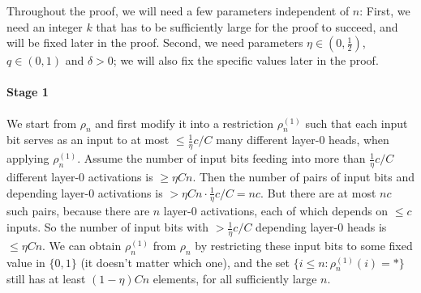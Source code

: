 \documentclass[11pt,a4paper]{article}
\begin{document}
Throughout the proof, we will need a few parameters independent of $n$: First, we need an integer $k$ that has to be sufficiently large for the proof to succeed, and will be fixed later in the proof.
Second, we need parameters $\eta \in (0, \frac{1}{2})$, $q \in (0,1)$ and $\delta > 0$; we will also fix the specific values later in the proof.



\paragraph{Stage 1}
We start from $\rho_n$ and first modify it into a restriction $\rho^{(1)}_n$ such that each input bit serves as an input to at most $\leq \frac{1}{\eta} c/C$ many different layer-0 heads, when applying $\rho^{(1)}_n$.
Assume the number of input bits feeding into more than $\frac{1}{\eta} c/C$ different layer-0 activations is $\geq \eta Cn$.
Then the number of pairs of input bits and depending layer-0 activations is $>\eta Cn \cdot \frac{1}{\eta} c/C = nc$.
But there are at most $nc$ such pairs, because there are $n$ layer-0 activations, each of which depends on $\leq c$ inputs.
So the number of input bits with $> \frac{1}{\eta} c/C$ depending layer-0 heads is $\leq \eta Cn$.
We can obtain $\rho^{(1)}_n$ from $\rho_n$ by restricting these input bits to some fixed value in $\{0, 1\}$ (it doesn't matter which one), and the set $\{i \leq n: \rho^{(1)}_n(i) = *\}$ still has at least $(1-\eta) C n$ elements, for all sufficiently large $n$.
\end{document}

